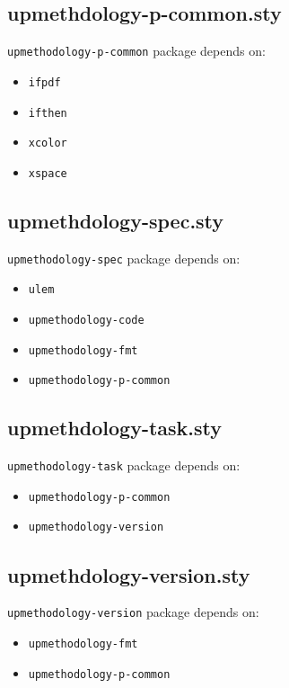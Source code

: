 \documentclass[book,taskpackage,specpackage,codepackage]{upmethodology-document}
\begin{document}
\subsection{upmethdology-p-common.sty}

\texttt{upmethodology-p-common} package depends on:
\begin{itemize}
\item \texttt{ifpdf}
\item \texttt{ifthen}
\item \texttt{xcolor}
\item \texttt{xspace}
\end{itemize}

\subsection{upmethdology-spec.sty}

\texttt{upmethodology-spec} package depends on:
\begin{itemize}
\item \texttt{ulem}
\item \texttt{upmethodology-code}
\item \texttt{upmethodology-fmt}
\item \texttt{upmethodology-p-common}
\end{itemize}

\subsection{upmethdology-task.sty}

\texttt{upmethodology-task} package depends on:
\begin{itemize}
\item \texttt{upmethodology-p-common}
\item \texttt{upmethodology-version}
\end{itemize}

\subsection{upmethdology-version.sty}

\texttt{upmethodology-version} package depends on:
\begin{itemize}
\item \texttt{upmethodology-fmt}
\item \texttt{upmethodology-p-common}
\end{itemize}


\end{document}

